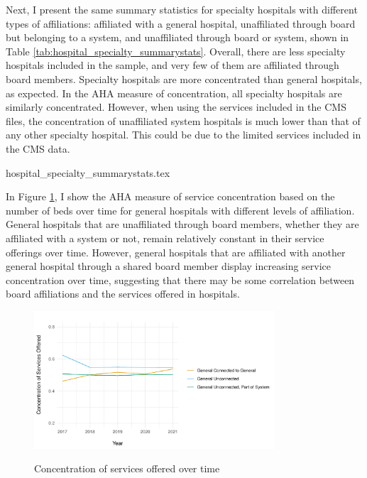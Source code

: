 \documentclass[12pt]{article}
\begin{document}
    Next, I present the same summary statistics for specialty hospitals with different types of affiliations: affiliated with a general hospital, unaffiliated through board but belonging to a system, and unaffiliated through board or system, shown in Table \ref{tab:hospital_specialty_summarystats}. Overall, there are less specialty hospitals included in the sample, and very few of them are affiliated through board members. Specialty hospitals are more concentrated than general hospitals, as expected. In the AHA measure of concentration, all specialty hospitals are similarly concentrated. However, when using the services included in the CMS files, the concentration of unaffiliated system hospitals is much lower than that of any other specialty hospital. This could be due to the limited services included in the CMS data. 

    {hospital_specialty_summarystats.tex}

    In Figure \ref{fig:concentration_services_time}, I show the AHA measure of service concentration based on the number of beds over time for general hospitals with different levels of affiliation. General hospitals that are unaffiliated through board members, whether they are affiliated with a system or not, remain relatively constant in their service offerings over time. However, general hospitals that are affiliated with another general hospital through a shared board member display increasing service concentration over time, suggesting that there may be some correlation between board affiliations and the services offered in hospitals.  

    \begin{figure}[ht!]
        \centering
        \caption{Concentration of services offered over time}
        \includegraphics[width=0.8\textwidth]{Objects/concentration_services_time.pdf}
        \label{fig:concentration_services_time}
    \end{figure}
\end{document}
